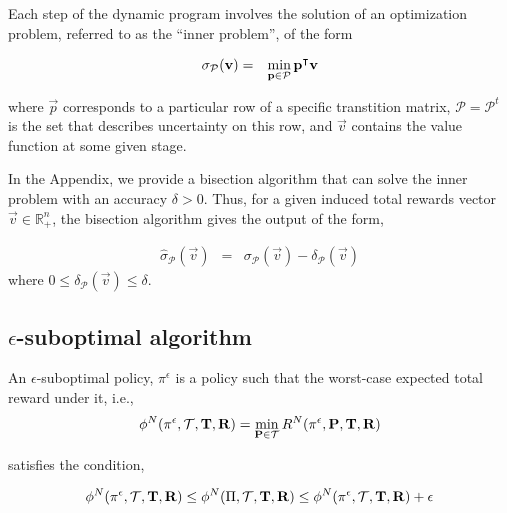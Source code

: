 Each step of the dynamic program involves the solution of an optimization problem, referred to as the ``inner problem'', of the form

\begin{eqnarray}
\sigma_{\mathcal{P}}(\mathbf{v}) &=& \min_{\mathbf{p} \in \mathcal{P}} \mathbf{p}^\intercal\mathbf{v}
\label{eq:inner_problem}
\end{eqnarray}

where $\vec{p}$ corresponds to a particular row of a specific transtition matrix, $\mathcal{P} = \mathcal{P}^t$ is the set that describes uncertainty on this row, and $\vec{v}$ contains the value function at some given stage. 



In the Appendix, we provide a bisection algorithm that can solve the inner problem with an accuracy $\delta > 0$. Thus, for a given induced total rewards vector $\vec{v} \in \mathbb{R}^n_+$, the bisection algorithm gives the output of the form,

\begin{eqnarray}
\hat{\sigma}_{\mathcal{P}} (\vec{v}) &=& \sigma_{\mathcal{P}} (\vec{v}) - \delta_{\mathcal{P}}(\vec{v})
\end{eqnarray} 
where $0 \leq \delta_{\mathcal{P}}(\vec{v}) \leq \delta$.

\subsection{\texorpdfstring{$\epsilon$}{epsilon}-suboptimal algorithm}

An $\epsilon$-suboptimal policy, $\pi^\epsilon$ is a policy such that the worst-case expected total reward under it, i.e., 
\begin{eqnarray*}
\phi^N(\pi^\epsilon, \mathcal{T}, \mathbf{T}, \mathbf{R}) = \min_{\mathbf{P} \in \mathcal{T}} R^N(\pi^\epsilon, \mathbf{P}, \mathbf{T}, \mathbf{R})
\end{eqnarray*}

satisfies the condition,

\begin{eqnarray}
\phi^N(\pi^\epsilon, \mathcal{T}, \mathbf{T}, \mathbf{R}) \leq \phi^N(\Pi, \mathcal{T}, \mathbf{T}, \mathbf{R}) \leq \phi^N(\pi^\epsilon, \mathcal{T}, \mathbf{T}, \mathbf{R}) + \epsilon
\end{eqnarray}

